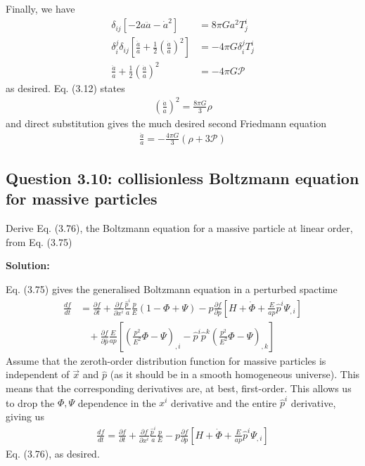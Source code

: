 \documentclass[11pt]{article}
\begin{document}
Finally, we have 
\begin{align*}
    \delta_{ij}[-2a\ddot{a} - \dot{a}^2] &= 8\pi G a^2 T^i_j \\
    \delta^j_i \delta_{ij} \left[ \frac{\ddot{a}}{a} + \frac{1}{2}\left(\frac{\dot{a}}{a}\right)^2 \right] &= -4\pi G \delta^j_i T^i_j \\ 
    \frac{\ddot{a}}{a} + \frac{1}{2}\left(\frac{\dot{a}}{a}\right)^2 &= -4\pi G \mathcal{P}
\end{align*}
as desired. Eq. (3.12) states 
\begin{align*}
    \left( \frac{\dot{a}}{a}\right)^2 = \frac{8\pi G}{3} \rho 
\end{align*}
and direct substitution gives the much desired second Friedmann equation 
\begin{align*}
    \frac{\ddot{a}}{a} = - \frac{4\pi G}{3}(\rho + 3 \mathcal{P})
\end{align*}

\subsection{Question 3.10: collisionless Boltzmann equation for massive particles}
Derive Eq. (3.76), the Boltzmann equation for a massive particle at linear order, from Eq. (3.75) 

\textbf{Solution:}

Eq. (3.75) gives the generalised Boltzmann equation in a perturbed spactime 
\begin{align*}
    \frac{df }{dt } &= \frac{\partial f}{\partial t} + \frac{\partial f}{\partial x^i} \frac{\hat{p}^i}{a}\frac{p}{E}(1 - \Phi + \Psi) - p\frac{\partial f}{\partial p} \left[ H + \dot{\Phi} + \frac{E}{ap } \hat{p}^i \Psi_{,i}\right] \\
    &~~~~+ \frac{\partial f}{\partial \hat{p}} \frac{E}{ap} \left[ \left( \frac{p^2}{E^2}\Phi - \Psi \right)_{,i} - \hat{p}^i \hat{p}^k \left( \frac{p^2}{E^2}\Phi - \Psi \right)_{,k} \right]  
\end{align*}
Assume that the zeroth-order distribution function for massive particles is independent of $\vec{x}$ and $\hat{p}$ (as it should be in a smooth homogeneous universe). This means that the corresponding derivatives are, at best, first-order. This allows us to drop the $\Phi, \Psi$ dependence in the $x^i$ derivative and the entire $\hat{p}^i$ derivative, giving us 
\begin{align*}
    \frac{df }{dt } = \frac{\partial f}{\partial t} + \frac{\partial f}{\partial x^i} \frac{\hat{p}^i}{a}\frac{p}{E} - p \frac{\partial f}{\partial p}\left[ H + \dot{\Phi} + \frac{E}{ap }\hat{p}^i \Psi_{,i}\right] 
\end{align*}
Eq. (3.76), as desired. 
\end{document}
